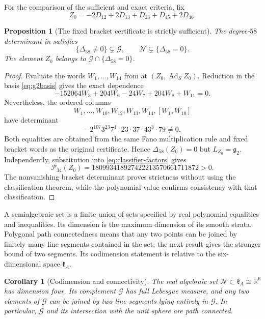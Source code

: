 \documentclass[11pt,a4paper]{article}
\newtheorem{proposition}[proposition]{Proposition}
\newtheorem{corollary}[corollary]{Corollary}
\newcommand{\RR}{\mathbb R}
\newcommand{\Ad}{\operatorname{Ad}}
\begin{document}
For the comparison of the sufficient and exact criteria, fix
\[
Z_0=-2D_{12}+2D_{13}+D_{23}+D_{45}+2D_{46}.
\]

\begin{proposition}[The fixed bracket certificate is strictly sufficient]
\label{prop:strict-certificate}
The degree-$58$ determinant in  satisfies
\[
\{\Delta_{58}\ne0\}\subsetneq\mathcal G,
\qquad \mathcal N\subsetneq\{\Delta_{58}=0\}.
\]
The element $Z_0$ belongs to $\mathcal G\cap\{\Delta_{58}=0\}$.
\end{proposition}

\begin{proof}
Evaluate the words $W_1,\ldots,W_{14}$ from  at $(Z_0,\Ad_S Z_0)$.  Reduction in the basis \eqref{eq:g2basis} gives the exact dependence
\[
-152064W_3+204W_6-24W_7+204W_8+W_{11}=0.
\]
Nevertheless, the ordered columns
\[
W_1,\ldots,W_{10},W_{12},W_{13},W_{14},[W_1,W_{10}]
\]
have determinant
\[
-2^{107}3^{23}7^4\cdot23\cdot37\cdot43^3\cdot79\ne0.
\]
Both equalities are obtained from the same Fano multiplication rule and fixed bracket words as the original certificate.  Hence $\Delta_{58}(Z_0)=0$ but $L_{Z_0}=\mathfrak g_2$.  Independently, substitution into \eqref{eq:classifier-factors} gives
\[
\mathcal P_{34}(Z_0)=180993418927422213570661711872>0.
\]
The nonvanishing bracket determinant proves strictness without using the classification theorem, while the polynomial value confirms consistency with that classification.
\end{proof}

A semialgebraic set is a finite union of sets specified by real polynomial equalities and inequalities.  Its dimension is the maximum dimension of its smooth strata.  Polygonal path connectedness means that any two points can be joined by finitely many line segments contained in the set; the next result gives the stronger bound of two segments.  Its codimension statement is relative to the six-dimensional space $\mathfrak k_A$.

\begin{corollary}[Codimension and connectivity]
\label{cor:dimension-connectivity}
The real algebraic set $\mathcal N\subset\mathfrak k_A\cong\RR^6$ has dimension four.  Its complement $\mathcal G$ has full Lebesgue measure, and any two elements of $\mathcal G$ can be joined by two line segments lying entirely in $\mathcal G$.  In particular, $\mathcal G$ and its intersection with the unit sphere are path connected.
\end{corollary}
\end{document}
